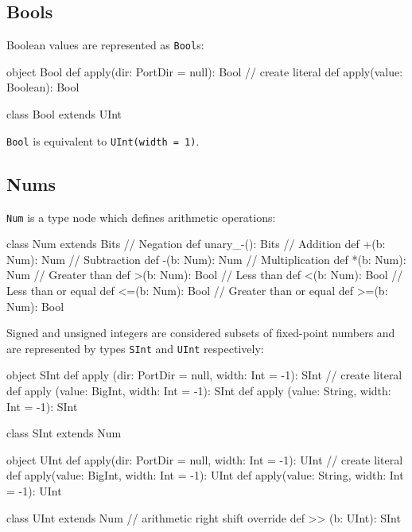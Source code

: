\documentclass[10pt,twocolumn]{article}
\def\code#1{{\small\tt #1}}
\begin{document}
\subsection{Bools}

Boolean values are represented as \code{Bool}s:

\begin{scala}
object Bool {
  def apply(dir: PortDir = null): Bool
  // create literal
  def apply(value: Boolean): Bool
}

class Bool extends UInt
\end{scala}

\noindent
\code{Bool} is equivalent to \code{UInt(width = 1)}.

\subsection{Nums}

\code{Num} is a type node which defines arithmetic operations:

\begin{scala}
class Num extends Bits {
  // Negation
  def unary_-(): Bits
  // Addition
  def +(b: Num): Num
  // Subtraction
  def -(b: Num): Num
  // Multiplication
  def *(b: Num): Num
  // Greater than
  def >(b: Num): Bool
  // Less than
  def <(b: Num): Bool
  // Less than or equal
  def <=(b: Num): Bool
  // Greater than or equal
  def >=(b: Num): Bool
}
\end{scala}


Signed and unsigned integers
are considered subsets of fixed-point numbers and are represented by
types \code{SInt} and \code{UInt} respectively:

\begin{scala}
object SInt {
  def apply (dir: PortDir = null, 
             width: Int = -1): SInt
  // create literal
  def apply (value: BigInt, width: Int = -1): SInt
  def apply (value: String, width: Int = -1): SInt
}

class SInt extends Num 

object UInt {
  def apply(dir: PortDir = null,
            width: Int = -1): UInt
  // create literal
  def apply(value: BigInt, width: Int = -1): UInt
  def apply(value: String, width: Int = -1): UInt
}

class UInt extends Num {
  // arithmetic right shift
  override def >> (b: UInt): SInt
}
\end{scala}
\end{document}
